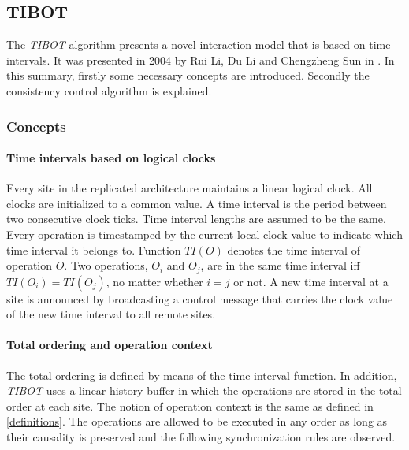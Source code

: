 \subsection{TIBOT}
\label{algo:tibot}

The \emph{TIBOT} algorithm presents a novel interaction model that is based on time intervals. It was presented in 2004 by Rui Li, Du Li and Chengzheng Sun in \cite{tibot}. In this summary, firstly some necessary concepts are introduced. Secondly the consistency control algorithm is explained.

\subsubsection{Concepts}
\paragraph{Time intervals based on logical clocks}
Every site in the replicated architecture maintains a linear logical clock. All clocks are initialized to a common value. A time interval is the period between two consecutive clock ticks. Time interval lengths are assumed to be the same. Every operation is timestamped by the current local clock value to indicate which time interval it belongs to. Function $TI(O)$ denotes the time interval of operation $O$. Two operations, $O_{i}$ and $O_{j}$, are in the same time interval iff $TI(O_{i}) = TI(O_{j})$, no matter whether $i = j$ or not. A new time interval at a site is announced by broadcasting a control message that carries the clock value of the new time interval to all remote sites.

\paragraph{Total ordering and operation context}
The total ordering is defined by means of the time interval function.  In addition, \emph{TIBOT} uses a linear history buffer in which the operations are stored in the total order at each site. The notion of operation context is the same as defined in \ref{definitions}. The operations are allowed to be executed in any order as long as their causality is preserved and the following synchronization rules are observed.

